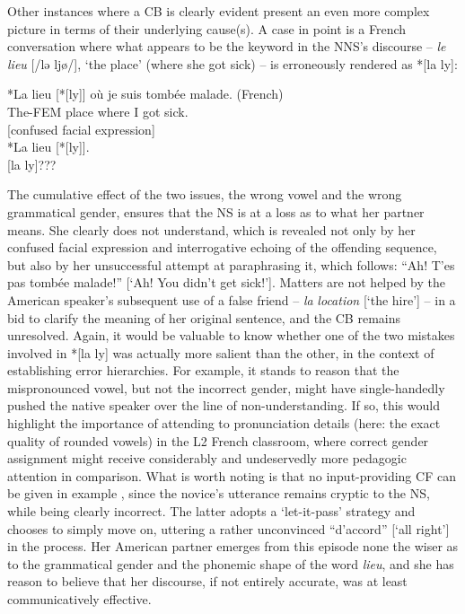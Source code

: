 \documentclass[output=paper,colorlinks,citecolor=brown,modfonts,nonflat]{../langscibook}
\begin{document}
Other instances where a CB is clearly evident present an even more complex picture in terms of their underlying cause(s). A case in point is a French conversation where what appears to be the keyword in the NNS’s discourse – \textit{le} \textit{lieu} [/lə ljø/], ‘the place’ (where she got sick) – is erroneously rendered as *[la ly]:

\ea\label{ex:scheuer:20}
{\NNS} *{La}  {lieu} [*[ly]]  {où} {je} {suis} {tombée} {malade.}   (French)\\
The-FEM  place  where I got        sick. \\
{\NS} [confused facial expression] \\
{\NNS} *{La} {lieu} [*[ly]].\\
{\NS} [la ly]???\\
\z

The cumulative effect of the two issues, the wrong vowel and the wrong grammatical gender, ensures that the NS is at a loss as to what her partner means. She clearly does not understand, which is revealed not only by her confused facial expression and interrogative echoing of the offending sequence, but also by her unsuccessful attempt at paraphrasing it, which follows: “Ah! T’es pas tombée malade!” [‘Ah! You didn’t get sick!’]. Matters are not helped by the American speaker’s subsequent use of a false friend – \textit{la} \textit{location} [‘the hire’] – in a bid to clarify the meaning of her original sentence, and the CB remains unresolved. Again, it would be valuable to know whether one of the two mistakes involved in *[la ly] was actually more salient than the other, in the context of establishing error hierarchies. For example, it stands to reason that the mispronounced vowel, but not the incorrect gender, might have single-handedly pushed the native speaker over the line of non-understanding. If so, this would highlight the importance of attending to pronunciation details (here: the exact quality of rounded vowels) in the L2 French classroom, where correct gender assignment might receive considerably and undeservedly more pedagogic attention in comparison. What is worth noting is that no input-providing CF can be given in example , since the novice’s utterance remains cryptic to the NS, while being clearly incorrect. The latter adopts a ‘let-it-pass’ strategy and chooses to simply move on, uttering a rather unconvinced “d’accord” [‘all right’] in the process. Her American partner emerges from this episode none the wiser as to the grammatical gender and the phonemic shape of the word \textit{lieu}, and she has reason to believe that her discourse, if not entirely accurate, was at least communicatively effective.
\end{document}
